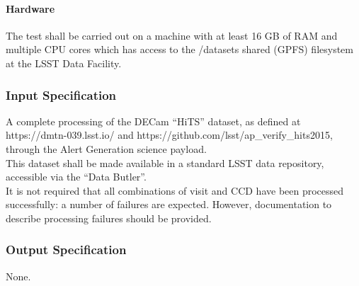 \paragraph{Hardware}
The test shall be carried out on a machine with at least 16 GB of RAM
and multiple CPU cores which has access to the /datasets shared (GPFS)
filesystem at the LSST Data Facility.


\subsubsection{Input Specification}
A complete processing of the DECam ``HiTS'' dataset, as defined at
https://dmtn-039.lsst.io/ and
https://github.com/lsst/ap\_verify\_hits2015, through the Alert
Generation science payload.\\
This dataset shall be made available in a standard LSST data repository,
accessible via the ``Data Butler''.\\
It is not required that all combinations of visit and CCD have been
processed successfully: a number of failures are expected. However,
documentation to describe processing failures should be provided.


\subsubsection{Output Specification}
None.


